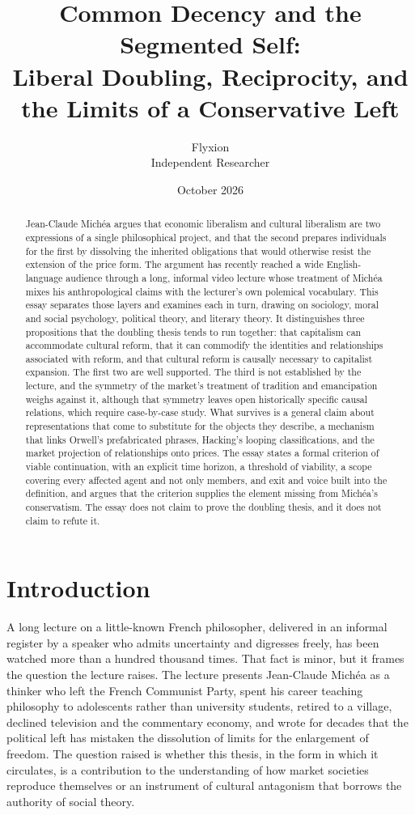 \documentclass[12pt]{article}
\title{Common Decency and the Segmented Self:\\
Liberal Doubling, Reciprocity, and the Limits of a Conservative Left}
\author{Flyxion\\Independent Researcher}
\date{October 2026}
\begin{document}
\maketitle

\begin{abstract}
\noindent Jean-Claude Michéa argues that economic liberalism and cultural liberalism are two expressions of a single philosophical project, and that the second prepares individuals for the first by dissolving the inherited obligations that would otherwise resist the extension of the price form. The argument has recently reached a wide English-language audience through a long, informal video lecture whose treatment of Michéa mixes his anthropological claims with the lecturer's own polemical vocabulary. This essay separates those layers and examines each in turn, drawing on sociology, moral and social psychology, political theory, and literary theory. It distinguishes three propositions that the doubling thesis tends to run together: that capitalism can accommodate cultural reform, that it can commodify the identities and relationships associated with reform, and that cultural reform is causally necessary to capitalist expansion. The first two are well supported. The third is not established by the lecture, and the symmetry of the market's treatment of tradition and emancipation weighs against it, although that symmetry leaves open historically specific causal relations, which require case-by-case study. What survives is a general claim about representations that come to substitute for the objects they describe, a mechanism that links Orwell's prefabricated phrases, Hacking's looping classifications, and the market projection of relationships onto prices. The essay states a formal criterion of viable continuation, with an explicit time horizon, a threshold of viability, a scope covering every affected agent and not only members, and exit and voice built into the definition, and argues that the criterion supplies the element missing from Michéa's conservatism. The essay does not claim to prove the doubling thesis, and it does not claim to refute it.
\end{abstract}

\section{Introduction}

A long lecture on a little-known French philosopher, delivered in an informal register by a speaker who admits uncertainty and digresses freely, has been watched more than a hundred thousand times. That fact is minor, but it frames the question the lecture raises. The lecture presents Jean-Claude Michéa as a thinker who left the French Communist Party, spent his career teaching philosophy to adolescents rather than university students, retired to a village, declined television and the commentary economy, and wrote for decades that the political left has mistaken the dissolution of limits for the enlargement of freedom. The question raised is whether this thesis, in the form in which it circulates, is a contribution to the understanding of how market societies reproduce themselves or an instrument of cultural antagonism that borrows the authority of social theory.
\end{document}
